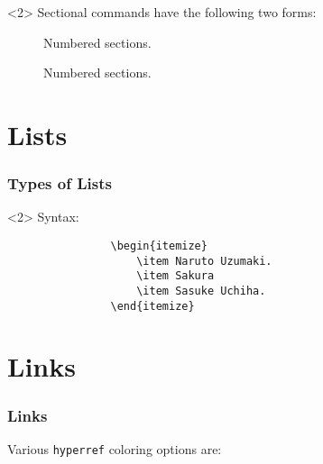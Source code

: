 \documentclass{beamer}
\begin{document}
\begin{frame}[fragile]
		\begin{onlyenv}<2>
			Sectional commands have the following two forms:
			\begin{description}
				\item[\texttt{\section{}}] Numbered sections.
				\item[\texttt{\section*{}}] Numbered sections.
			\end{description}
		\end{onlyenv}
	\end{frame}

	\section{Lists}
	\begin{frame}[fragile]
		\frametitle{Types of Lists}
		\begin{onlyenv}<2>
			Syntax:
			\begin{verbatim}
				\begin{itemize}
					\item Naruto Uzumaki.
					\item Sakura
					\item Sasuke Uchiha.
				\end{itemize}
			\end{verbatim}
		\end{onlyenv}
	\end{frame}
	
	\section{Links}
	\begin{frame}
		\frametitle{Links}
		Various \texttt{hyperref} coloring options are:
		\begin{description}[align=left]
			\item[\texttt{linkcolor}]
			\item[\texttt{urlcolor}]
			\item[\texttt{citecolor}]
			\item[\texttt{filecolor}]
			\item[\texttt{linkbordercolor}]
			\item[\texttt{urlbordercolor}]
			\item[\texttt{citebordercolor}]
		\end{description}
	\end{frame}
\end{document}

